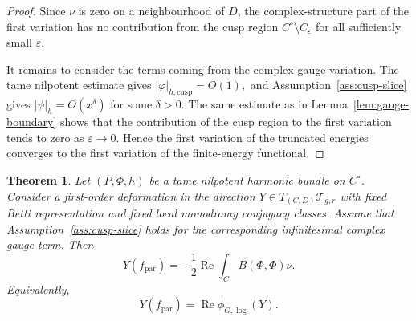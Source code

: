 \documentclass[11pt,reqno]{amsart}
\numberwithin{equation}{section}
\theoremstyle{plain}
\newtheorem{theorem}{Theorem}[section]
\theoremstyle{definition}
\theoremstyle{remark}
\begin{document}
\begin{proof}
Since \(\nu\) is zero on a neighbourhood of \(D\), the complex-structure part of
the first variation has no contribution from the cusp region
\(
        C^\circ\setminus C_\varepsilon
\)
for all sufficiently small \(\varepsilon\).

It remains to consider the terms coming from the complex gauge variation.  The
tame nilpotent estimate gives
\(
        |\varphi|_{h,\mathrm{cusp}}=O(1),
\)
and Assumption~\ref{ass:cusp-slice} gives
\(
        |\psi|_h=O(x^\delta)
\)
for some \(\delta>0\).  The same estimate as in
Lemma~\ref{lem:gauge-boundary} shows that the contribution of the cusp region
to the first variation tends to zero as \(\varepsilon\to0\).  Hence the first
variation of the truncated energies converges to the first variation of the
finite-energy functional.
\end{proof}


\begin{theorem}
\label{thm:log-energy}
Let \((P,\Phi,h)\) be a tame nilpotent harmonic bundle on \(C^\circ\). Consider
a first-order deformation in the direction
\(
        Y\in T_{(C,D)}\mathcal T_{g,r}
\)
with fixed Betti representation and fixed local monodromy conjugacy classes.
Assume that Assumption~\ref{ass:cusp-slice} holds for the corresponding
infinitesimal complex gauge term. Then
\[
        Y(f_{\mathrm{par}})
        =
        -\frac12\operatorname{Re}
        \int_C B(\Phi,\Phi)\nu.
\]
Equivalently,
\[
        Y(f_{\mathrm{par}})
        =
        \operatorname{Re}\phi_{G,\log}(Y).
\]
\end{theorem}
\end{document}
